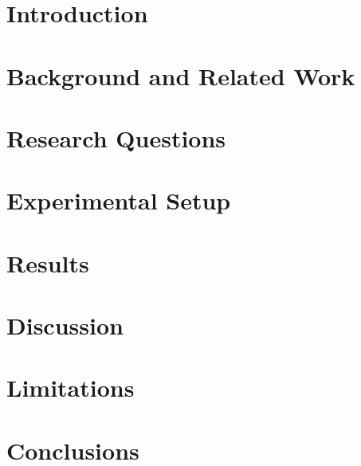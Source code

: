 \documentclass{sig-alternate}
\begin{document}


\section{Introduction}

\section{Background and Related Work}

\section{Research Questions}





\section{Experimental Setup}

\section{Results}

\section{Discussion}

\section{Limitations}

\section{Conclusions}



\end{document}
